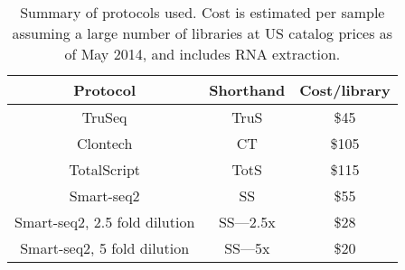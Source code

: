 \begin{table}[htdp]
\caption{Summary of protocols used. Cost is estimated per sample assuming a
     large number of libraries at US catalog prices as of May 2014, and includes RNA extraction.  }
\begin{tabular}{|c|c|c|}\hline
Protocol & Shorthand & Cost/library \\\hline
TruSeq & TruS & \$45 \\
Clontech & CT & \$105 \\
TotalScript & TotS & \$115 \\
Smart-seq2 & SS & \$55 \\
Smart-seq2, 2.5 fold dilution & SS---2.5x & \$28 \\
Smart-seq2, 5 fold dilution & SS---5x & \$20 \\
\hline\end{tabular}
\label{tab:protocolcosts}
\end{table}

